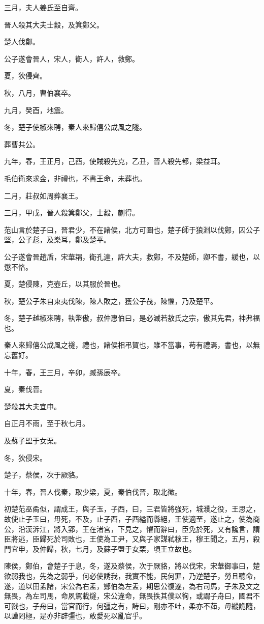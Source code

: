 \begin{pinyinscope}
三月，夫人姜氏至自齊。

晉人殺其大夫士縠，及箕鄭父。

楚人伐鄭。

公子遂會晉人，宋人，衛人，許人，救鄭。

夏，狄侵齊。

秋，八月，曹伯襄卒。

九月，癸酉，地震。

冬，楚子使椒來聘，秦人來歸僖公成風之隧。

葬曹共公。

九年，春，王正月，己酉，使賊殺先克，乙丑，晉人殺先都，梁益耳。

毛伯衛來求金，非禮也，不書王命，未葬也。

二月，莊叔如周葬襄王。

三月，甲戌，晉人殺箕鄭父，士縠，蒯得。

范山言於楚子曰，晉君少，不在諸侯，北方可圖也，楚子師于狼淵以伐鄭，囚公子堅，公子尨，及樂耳，鄭及楚平。

公子遂會晉趙盾，宋華耦，衛孔達，許大夫，救鄭，不及楚師，卿不書，緩也，以懲不恪。

夏，楚侵陳，克壺丘，以其服於晉也。

秋，楚公子朱自東夷伐陳，陳人敗之，獲公子茷，陳懼，乃及楚平。

冬，楚子越椒來聘，執幣傲，叔仲惠伯曰，是必滅若敖氏之宗，傲其先君，神弗福也。

秦人來歸僖公成風之襚，禮也，諸侯相弔賀也，雖不當事，苟有禮焉，書也，以無忘舊好。

十年，春，王三月，辛卯，臧孫辰卒。

夏，秦伐晉。

楚殺其大夫宜申。

自正月不雨，至于秋七月。

及蘇子盟于女栗。

冬，狄侵宋。

楚子，蔡侯，次于厥貉。

十年，春，晉人伐秦，取少梁，夏，秦伯伐晉，取北徵。

初楚范巫矞似，謂成王，與子玉，子西，曰，三君皆將強死，城濮之役，王思之，故使止子玉曰，毋死，不及，止子西，子西縊而縣絕，王使適至，遂止之，使為商公，沿漢泝江，將入郢，王在渚宮，下見之，懼而辭曰，臣免於死，又有讒言，謂臣將逃，臣歸死於司敗也，王使為工尹，又與子家謀弒穆王，穆王聞之，五月，殺鬥宜申，及仲歸，秋，七月，及蘇子盟于女栗，頃王立故也。

陳侯，鄭伯，會楚子于息，冬，遂及蔡侯，次于厥貉，將以伐宋，宋華御事曰，楚欲弱我也，先為之弱乎，何必使誘我，我實不能，民何罪，乃逆楚子，勞且聽命，遂，道以田孟諸，宋公為右盂，鄭伯為左盂，期思公復遂，為右司馬，子朱及文之無畏，為左司馬，命夙駕載燧，宋公違命，無畏抶其僕以徇，或謂子舟曰，國君不可戮也，子舟曰，當官而行，何彊之有，詩曰，剛亦不吐，柔亦不茹，毋縱詭隨，以謹罔極，是亦非辟彊也，敢愛死以亂官乎。


\end{pinyinscope}
